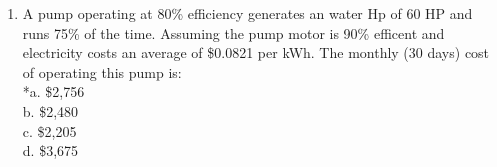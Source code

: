 \begin{enumerate}
\item  A pump operating at 80\% efficiency generates an water Hp of 60 HP and runs 75\% of the time. Assuming the pump motor is 90\% efficent and electricity costs an average of \$0.0821 per kWh. The monthly (30 days) cost of operating this pump is:\\

*a. \$2,756 \\
b. \$2,480 \\
c. \$2,205 \\
d. \$3,675 






\end{enumerate}





